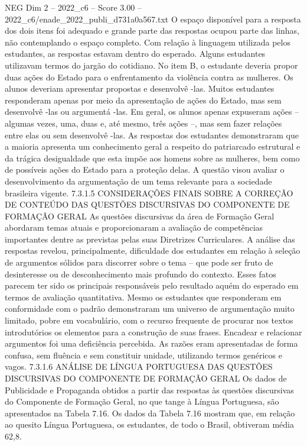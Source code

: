 \begin{textsample}{NEG Dim 2 – 2022\_c6 – Score 3.00 – 2022\_c6/enade\_2022\_publi\_d731a0a567.txt}
O espaço disponível para a resposta dos dois itens foi adequado e grande parte das respostas ocupou parte das linhas, não contemplando o espaço completo.
Com relação à linguagem utilizada pelos estudantes, as respostas estavam dentro do esperado.
Alguns estudantes utilizavam termos do jargão do cotidiano.
No item B, o estudante deveria propor duas ações do Estado para o enfrentamento da violência contra as mulheres.
Os alunos deveriam apresentar propostas e desenvolvê -las.
Muitos estudantes responderam apenas por meio da apresentação de ações do Estado, mas sem desenvolvê -las ou argumentá -las.
Em geral, os alunos apenas expuseram ações – algumas vezes, uma, duas e, até mesmo, três ações –, mas sem fazer relações entre elas ou sem desenvolvê -las.
As respostas dos estudantes demonstraram que a maioria apresenta um conhecimento geral a respeito do patriarcado estrutural e da trágica desigualdade que esta impõe aos homens sobre as mulheres, bem como de possíveis ações do Estado para a proteção delas.
A questão visou avaliar o desenvolvimento da argumentação de um tema relevante para a sociedade brasileira vigente. 7.3.1.5 CONSIDERAÇÕES FINAIS SOBRE A CORREÇÃO DE CONTEÚDO DAS QUESTÕES DISCURSIVAS DO COMPONENTE DE FORMAÇÃO GERAL As questões discursivas da área de Formação Geral abordaram temas atuais e proporcionaram a avaliação de competências importantes dentre as previstas pelas suas Diretrizes Curriculares.
A análise das respostas revelou, principalmente, dificuldade dos estudantes em relação à seleção de argumentos sólidos para discorrer sobre o tema – que pode ser fruto de desinteresse ou de desconhecimento mais profundo do contexto.
Esses fatos parecem ter sido os principais responsáveis pelo resultado aquém do esperado em termos de avaliação quantitativa.
Mesmo os estudantes que responderam em conformidade com o padrão demonstraram um universo de argumentação muito limitado, pobre em vocabulário, com o recurso frequente de procurar nos textos introdutórios os elementos para a construção de suas frases.
Encadear e relacionar argumentos foi uma deficiência percebida.
As razões eram apresentadas de forma confusa, sem fluência e sem constituir unidade, utilizando termos genéricos e vagos. 7.3.1.6 ANÁLISE DE LÍNGUA PORTUGUESA DAS QUESTÕES DISCURSIVAS DO COMPONENTE DE FORMAÇÃO GERAL Os dados de Publicidade e Propaganda obtidos a partir das respostas às questões discursivas do Componente de Formação Geral, no que tange à Língua Portuguesa, são apresentados na Tabela 7.16.
Os dados da Tabela 7.16 mostram que, em relação ao quesito Língua Portuguesa, os estudantes, de todo o Brasil, obtiveram média 62,8.

\end{textsample}
